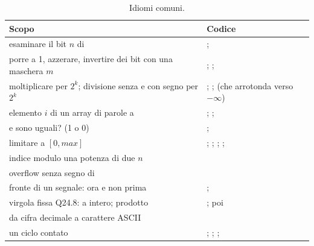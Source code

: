 \begin{table}[htb]
\centering\small
\caption{Idiomi comuni.}\label{tab:rv:idioms}
\begin{tabularx}{\textwidth}{@{}LP{0.47\textwidth}@{}}
\toprule
\textbf{Scopo} & \textbf{Codice}\\
\midrule
esaminare il bit $n$ di  &  ; \\
porre a 1, azzerare, invertire dei bit con una maschera $m$ &  ;  ; \\
moltiplicare per $2^{k}$; divisione senza e con segno per $2^{k}$ &  ;  ;  (che arrotonda verso $-\infty$)\\
elemento $i$ di un array di parole a  &  ;  ; \\
 e  sono uguali? (1 o 0) &  ; \\
limitare  a $[0, max]$ &  ;  ;  ;  ; \\
indice modulo una potenza di due $n$ & \\
overflow senza segno di  & \\
fronte di un segnale: ora e non prima &  ; \\
virgola fissa Q24.8: a intero; prodotto &  ;  poi \\
da cifra decimale a carattere ASCII & \\
un ciclo contato &  ;  ;  ; \\
\bottomrule
\end{tabularx}
\end{table}
